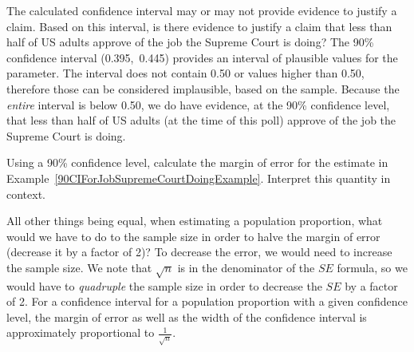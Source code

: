 \begin{examplewrap}
\begin{nexample}
{The calculated confidence interval may or may not provide evidence to justify a claim.  Based on this interval, is there evidence to justify a claim that less than half of US adults approve of the job the Supreme Court is doing?}
\label{JobSupremeCourtDoingEvidenceExample}
The 90\% confidence interval (0.395,\ 0.445) provides an interval of plausible values for the parameter.  The interval does not contain 0.50 or values higher than 0.50, therefore those can be considered implausible, based on the sample.  Because the \emph{entire} interval is below 0.50, we do have evidence, at the 90\% confidence level, that less than half of US adults (at the time of this poll) approve of the job the Supreme Court is doing.
\end{nexample}
\end{examplewrap}

\begin{exercisewrap}
\begin{nexercise}
Using a 90\% confidence level, calculate the margin of error for the estimate in Example~\ref{90CIForJobSupremeCourtDoingExample}. Interpret this quantity in context.\footnotemark
\end{nexercise}
\end{exercisewrap}

\D{\newpage}

\begin{examplewrap}
\begin{nexample}{All other things being equal, when estimating a population proportion, what would we have to do to the sample size in order to halve the margin of error (decrease it by a factor of 2)?}
To decrease the error, we would need to increase the sample size.  We note that $\sqrt{n}$ is in the denominator of the $SE$ formula, so we would have to \emph{quadruple} the sample size in order to decrease the $SE$ by a factor of 2. For a confidence interval for a population proportion with a given confidence level, the margin of error as well as the width of the confidence interval is approximately proportional to $\frac{1}{\sqrt{n}}$.
\end{nexample}
\end{examplewrap}


